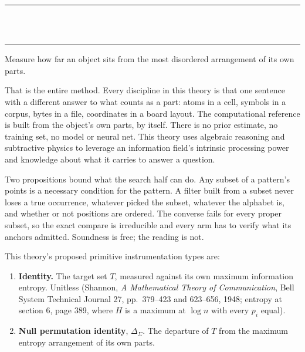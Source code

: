 \thispagestyle{empty}
\begin{center}
  \rule{\textwidth}{0.4pt}\\[0.9em]
  {\Large{}}\\[0.7em]
  \rule{\textwidth}{0.4pt}
\end{center}
\bigskip

\noindent Measure how far an object sits from the most disordered arrangement of its own parts.

That is the entire method. Every discipline in this theory is that one sentence with a different answer to
what counts as a part: atoms in a cell, symbols in a corpus, bytes in a file, coordinates in a board
layout. The computational reference is built from the object's own parts, by itself. There is no prior
estimate, no training set, no model or neural net. This theory uses algebraic reasoning and
subtractive physics to leverage an information field's intrinsic processing power and knowledge
about what it carries to answer a question.

Two propositions bound what the search half can do. Any subset of a pattern's points is a necessary
condition for the pattern. A filter built from a subset never loses a true occurrence, whatever
picked the subset, whatever the alphabet is, and whether or not positions are ordered. The converse fails for every proper subset, so the exact compare is irreducible and every
arm has to verify what its anchors admitted. Soundness is free; the reading is not.

This theory's proposed primitive instrumentation types are:

\begin{enumerate}
  \item \textbf{Identity.} The target set $T$, measured against its own maximum information
    entropy. Unitless (Shannon, \emph{A Mathematical Theory of Communication}, Bell System
    Technical Journal 27, pp.~379--423 and 623--656, 1948; entropy at section 6, page 389, where
    $H$ is a maximum at $\log n$ with every $p_i$ equal).
  \item \textbf{Null permutation identity}, $\Delta_{\Sigma}$. The departure of $T$ from the
    maximum entropy arrangement of its own parts.
\end{enumerate}

